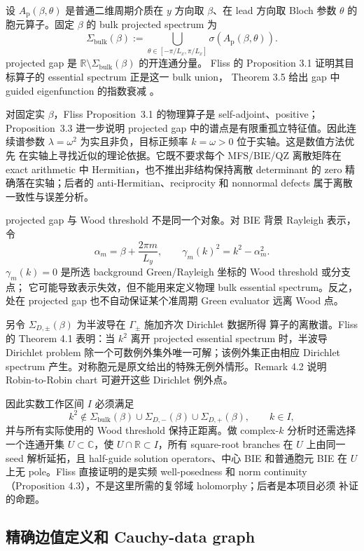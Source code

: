 \documentclass[UTF8,fontset=fandol,11pt,a4paper]{ctexart}
\begin{document}
设 $A_{\mathrm p}(\beta,\theta)$ 是普通二维周期介质在 $y$ 方向取 $\beta$、在 lead
方向取 Bloch 参数 $\theta$ 的胞元算子。固定 $\beta$ 的 bulk projected spectrum 为
\[
  \Sigma_{\mathrm{bulk}}(\beta)
  :=\bigcup_{\theta\in[-\pi/L_x,\pi/L_x]}
    \sigma\!\left(A_{\mathrm p}(\beta,\theta)\right).
\]
projected gap 是 $\mathbb R\setminus\Sigma_{\mathrm{bulk}}(\beta)$ 的开连通分量。
Fliss 的 Proposition 3.1 证明其目标算子的 essential spectrum 正是这一 bulk union，
Theorem 3.5 给出 gap 中 guided eigenfunction 的指数衰减
\cite{Fliss2013}。

对固定实 $\beta$，Fliss Proposition~3.1 的物理算子是 self-adjoint、positive；
Proposition~3.3 进一步说明 projected gap 中的谱点是有限重孤立特征值。因此连续谱参数
$\lambda=\omega^2$ 为实且非负，目标正频率 $k=\omega>0$ 位于实轴。这是数值方法优先
在实轴上寻找近似的理论依据。它既不要求每个 MFS/BIE/QZ 离散矩阵在 exact arithmetic
中 Hermitian，也不推出非结构保持离散 determinant 的 zero 精确落在实轴；后者的
anti-Hermitian、reciprocity 和 nonnormal defects 属于离散一致性与误差分析。

projected gap 与 Wood threshold 不是同一个对象。对 BIE 背景 Rayleigh 表示，令
\[
  \alpha_m=\beta+\frac{2\pi m}{L_y},
  \qquad
  \gamma_m(k)^2=k^2-\alpha_m^2.
\]
$\gamma_m(k)=0$ 是所选 background Green/Rayleigh 坐标的 Wood threshold 或分支点；
它可能导致表示失效，但不能用来定义物理 bulk essential spectrum。反之，处在
projected gap 也不自动保证某个准周期 Green evaluator 远离 Wood 点。

另令 $\Sigma_{D,\pm}(\beta)$ 为半波导在 $\Gamma_\pm$ 施加齐次 Dirichlet 数据所得
算子的离散谱。Fliss 的 Theorem 4.1 表明：当 $k^2$ 离开 projected essential spectrum
时，半波导 Dirichlet problem 除一个可数例外集外唯一可解；该例外集正由相应
Dirichlet spectrum 产生。对称胞元是原文给出的特殊无例外情形。Remark 4.2 说明
Robin-to-Robin chart 可避开这些 Dirichlet 例外点\cite{Fliss2013}。

因此实数工作区间 $I$ 必须满足
\[
  k^2\notin
  \Sigma_{\mathrm{bulk}}(\beta)
  \cup\Sigma_{D,-}(\beta)
  \cup\Sigma_{D,+}(\beta),
  \qquad k\in I,
\]
并与所有实际使用的 Wood threshold 保持正距离。做 complex-$k$ 分析时还需选择
一个连通开集 $U\subset\mathbb C$，使 $U\cap\mathbb R\subset I$，所有 square-root
branches 在 $U$ 上由同一 seed 解析延拓，且 half-guide solution operators、中心 BIE
和普通胞元 BIE 在 $U$ 上无 pole。Fliss 直接证明的是实频 well-posedness 和 norm
continuity（Proposition 4.3），不是这里所需的复邻域 holomorphy；后者是本项目必须
补证的命题。

\subsection{精确边值定义和 Cauchy-data graph}
\end{document}
